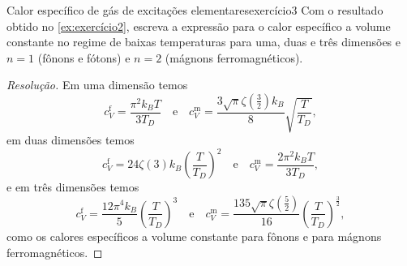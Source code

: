 \begin{exercício}{Calor específico de gás de excitações elementares}{exercício3}
    Com o resultado obtido no \cref{ex:exercício2}, escreva a expressão para o calor específico a volume constante no regime de baixas temperaturas para uma, duas e três dimensões e \(n = 1\) (fônons e fótons) e \(n = 2\) (mágnons ferromagnéticos).
\end{exercício}
\begin{proof}[Resolução]
    Em uma dimensão temos
    \begin{equation*}
        c_V^\mathrm{f} = \frac{\pi^2 k_BT}{3T_D}\quad\text{e}\quad
        c_V^\mathrm{m} = \frac{3 \sqrt{\pi} \zeta\left(\frac32\right)k_B}{8} \sqrt{\frac{T}{T_D}},
    \end{equation*}
    em duas dimensões temos
    \begin{equation*}
        c_V^\mathrm{f} = 24 \zeta(3) k_B\left(\frac{T}{T_D}\right)^{2}\quad\text{e}\quad
        c_V^\mathrm{m} = \frac{2\pi^2k_B T}{3T_D},
    \end{equation*}
    e em três dimensões temos
    \begin{equation*}
        c_V^\mathrm{f} = \frac{12 \pi^4 k_B}{5}\left(\frac{T}{T_D}\right)^3\quad\text{e}\quad
        c_V^\mathrm{m} = \frac{135\sqrt{\pi} \zeta\left(\frac{5}{2}\right)}{16}\left(\frac{T}{T_D}\right)^{\frac32},
    \end{equation*}
    como os calores específicos a volume constante para fônons e para mágnons ferromagnéticos.
\end{proof}
